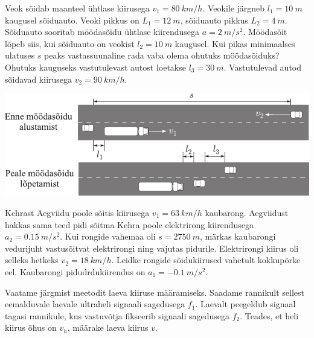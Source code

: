 \documentclass[10pt, twoside]{article}
\begin{document}
{%

Veok sõidab maanteel ühtlase kiirusega $v_1 = \SI{80}{km/h}$. Veokile järgneb $l_1 = \SI{10}{m}$ kaugusel sõiduauto. Veoki pikkus on $L_1 = \SI{12}{m}$, sõiduauto pikkus $L_2 = \SI{4}{m}$. Sõiduauto sooritab möödasõidu ühtlase kiirendusega $a = \SI{2}{m/s^2}$. Möödasõit lõpeb siis, kui sõiduauto on veokist $l_2 = \SI{10}{m}$ kaugusel. Kui pikas minimaalses ulatuses $s$ peaks vastassuunaline rada vaba olema ohutuks möödasõiduks? Ohutuks kauguseks vastutulevast autost loetakse $l_3 = \SI{30}{m}$. Vastutulevad autod sõidavad kiirusega $v_2 = \SI{90}{km/h}$.

\begin{center}
	\includegraphics[width=\linewidth]{2005-v2g-01-yl}
\end{center}
\probend
\bigskip


Kehrast Aegviidu poole sõitis kiirusega $v_1=\SI{63}{km/h}$ kaubarong. Aegviidust hakkas sama teed pidi sõitma Kehra poole elektrirong kiirendusega $a_2=\SI{0,15}{m/s^2}$. Kui rongide vahemaa oli $s=\SI{2750}{m}$, märkas kaubarongi vedurijuht vastusõitvat elektrirongi ning vajutas pidurile. Elektrirongi kiirus oli selleks hetkeks $v_2=\SI{18}{km/h}$. Leidke rongide sõidukiirused vahetult kokkupõrke eel. Kaubarongi pidudrdukiirendus on $a_1=-\SI{0,1}{m/s^2}$.
\probend
\bigskip


Vaatame järgmist meetodit laeva kiiruse määramiseks. Saadame rannikult sellest eemalduvale laevale ultraheli signaali sagedusega $f_1$. Laevalt peegeldub signaal tagasi rannikule, kus vastuvõtja fikseerib signaali sagedusega $f_2$. Teades, et heli kiirus õhus on $v_h$, määrake laeva kiirus $v$.
\probend
\bigskip

}
\end{document}
